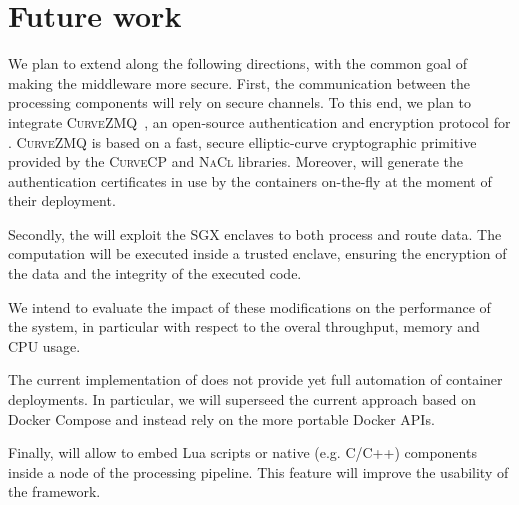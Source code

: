 \section{Future work}
\label{sec:future}


We plan to extend \SYS along the following directions, with the common goal of making the middleware more secure.
First, the communication between the processing components will rely on secure channels. 
To this end, we plan to integrate \textsc{CurveZMQ}~\cite{zmq:curvezmq}, an open-source authentication and encryption protocol for \zmq.
\textsc{CurveZMQ} is based on a fast, secure elliptic-curve cryptographic primitive provided by the \textsc{CurveCP}\cite{zmq:curvecp} and \textsc{NaCl}\cite{zmq:nacl} libraries.
Moreover, \SYS will generate the authentication certificates in use by the containers on-the-fly at the moment of their deployment.

Secondly, the \SYS will exploit the SGX enclaves to both process and route data.
The computation will be executed inside a trusted enclave, ensuring the encryption of the data and the integrity of the executed code.

We intend to evaluate the impact of these modifications on the performance of the system, in particular with respect to the overal throughput, memory and CPU usage.

The current implementation of \SYS does not provide yet full automation of container deployments.
In particular, we will superseed the current approach based on Docker Compose and instead rely on the more portable Docker APIs.

Finally, \SYS will allow to embed Lua scripts or native (e.g. C/C++) components inside a node of the processing pipeline.
This feature will improve the usability of the framework.
